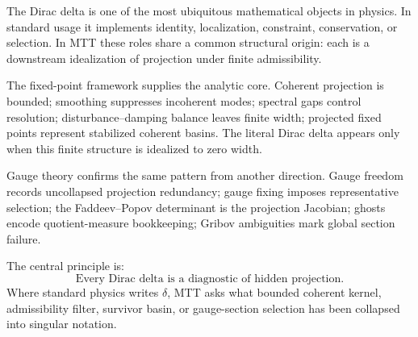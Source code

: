 \documentclass[11pt]{article}
\begin{document}
The Dirac delta is one of the most ubiquitous mathematical objects in physics.  In standard
usage it implements identity, localization, constraint, conservation, or selection.  In MTT
these roles share a common structural origin: each is a downstream idealization of projection
under finite admissibility.

The fixed-point framework supplies the analytic core.  Coherent projection is bounded;
smoothing suppresses incoherent modes; spectral gaps control resolution; disturbance--damping
balance leaves finite width; projected fixed points represent stabilized coherent basins.  The
literal Dirac delta appears only when this finite structure is idealized to zero width.

Gauge theory confirms the same pattern from another direction.  Gauge freedom records
uncollapsed projection redundancy; gauge fixing imposes representative selection; the
Faddeev--Popov determinant is the projection Jacobian; ghosts encode quotient-measure
bookkeeping; Gribov ambiguities mark global section failure.

The central principle is:
\[
\boxed{\text{Every Dirac delta is a diagnostic of hidden projection.}}
\]
Where standard physics writes \(\delta\), MTT asks what bounded coherent kernel,
admissibility filter, survivor basin, or gauge-section selection has been collapsed into
singular notation.
\end{document}
